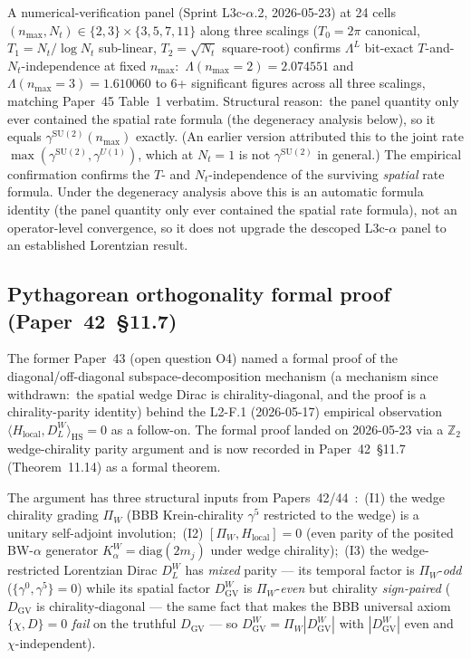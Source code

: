 \documentclass[11pt,a4paper]{article}
\theoremstyle{plain}
\theoremstyle{definition}
\newcommand{\nmax}{n_{\max}}
\newcommand{\Nt}{N_{t}}
\newcommand{\DGV}{D_{\mathrm{GV}}}
\newcommand{\DL}{D_{L}}
\newcommand{\Z}{\mathbb{Z}}
\newcommand{\SU}{\mathrm{SU}}
\begin{document}
A numerical-verification panel (Sprint L3c-$\alpha$.2, 2026-05-23) at
24 cells $(\nmax, \Nt) \in \{2, 3\} \times \{3, 5, 7, 11\}$ along
three scalings ($T_{0} = 2\pi$ canonical, $T_{1} = \Nt/\log\Nt$
sub-linear, $T_{2} = \sqrt{\Nt}$ square-root) confirms
$\Lambda^{L}$ bit-exact $T$-and-$\Nt$-independence at fixed $\nmax$:\
$\Lambda(\nmax=2) = 2.074551$ and $\Lambda(\nmax=3) = 1.610060$
to 6+ significant figures across all three scalings, matching
Paper~45 Table~1 verbatim.  Structural reason:\ the panel quantity only
ever contained the spatial rate formula (the degeneracy analysis below), so
it equals $\gamma^{\SU(2)}(\nmax)$ exactly.  (An earlier version attributed
this to the joint rate $\max(\gamma^{\SU(2)}, \gamma^{U(1)})$, which at
$\Nt = 1$ is not $\gamma^{\SU(2)}$ in general.)  The empirical confirmation
confirms the $T$- and $N_t$-independence of the surviving
\emph{spatial} rate formula.  Under the degeneracy analysis above this is
an automatic formula identity (the panel quantity only ever contained the
spatial rate formula), not an operator-level convergence, so it does not
upgrade the descoped L3c-$\alpha$ panel to an established Lorentzian
result.

\subsection{Pythagorean orthogonality formal proof (Paper~42~\S 11.7)}
\label{sec:closures_pythagorean}

The former Paper~43 (open question O4) named a formal proof of the diagonal/off-diagonal
subspace-decomposition mechanism (a mechanism since withdrawn:\ the
spatial wedge Dirac is chirality-diagonal, and the proof is a
chirality-parity identity) behind the L2-F.1 (2026-05-17)
empirical observation $\langle H_{\mathrm{local}}, \DL^{W}
\rangle_{\mathrm{HS}} = 0$ as a follow-on.  The formal proof landed on
2026-05-23 via a $\Z_{2}$ wedge-chirality parity argument and is now
recorded in Paper~42~\S 11.7 (Theorem~11.14) as a formal theorem.

The argument has three structural inputs from
Papers~42/44~\cite{paper42,paper44}:\
(I1) the wedge chirality grading $\Pi_{W}$ (BBB Krein-chirality
$\gamma^{5}$ restricted to the wedge) is a unitary self-adjoint
involution;\
(I2) $[\Pi_{W}, H_{\mathrm{local}}] = 0$ (even parity of the
posited BW-$\alpha$ generator $K_{\alpha}^{W} = \mathrm{diag}(2m_{j})$
under wedge chirality);\
(I3) the wedge-restricted Lorentzian Dirac $\DL^{W}$ has \emph{mixed}
parity --- its temporal factor is $\Pi_{W}$-\emph{odd}
($\{\gamma^{0}, \gamma^{5}\} = 0$) while its spatial factor $\DGV^{W}$ is
$\Pi_{W}$-\emph{even} but chirality \emph{sign-paired} ($\DGV$ is
chirality-diagonal --- the same fact that makes the BBB universal axiom
$\{\chi, D\} = 0$ \emph{fail} on the truthful $\DGV$ ---
so $\DGV^{W} = \Pi_{W}|\DGV^{W}|$ with $|\DGV^{W}|$ even and
$\chi$-independent).
\end{document}
